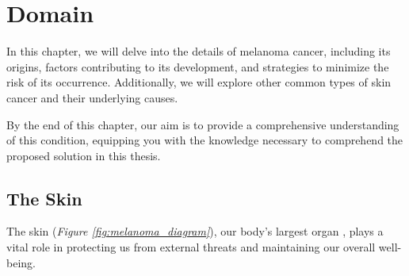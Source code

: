 \chapter{Domain} \label{cap:problem_domain}

In this chapter, we will delve into the details of melanoma cancer, including
its origins, factors contributing to its development, and strategies to
minimize the risk of its occurrence. Additionally, we will explore other common
types of skin cancer and their underlying causes. \newline

By the end of this chapter, our aim is to provide a comprehensive understanding
of this condition, equipping you with the knowledge necessary to comprehend the
proposed solution in this thesis.

\section{The Skin}

The skin (\textit{Figure \ref{fig:melanoma_diagram}}), our body's largest organ
\cite{BaseCancerKnowledge}, plays a vital role in protecting us from external
threats and maintaining our overall well-being.

